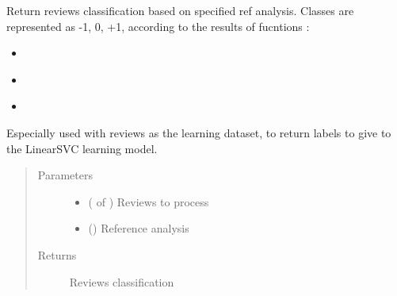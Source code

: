 \documentclass[letterpaper,10pt,english]{sphinxmanual}
\begin{document}
\begin{fulllineitems}
\label{\detokenize{learning:loacore.learning.svm.get_labels_vector}}
Return reviews classification based on specified ref analysis. Classes are represented as -1, 0, +1, according to
the results of {\hyperref[\detokenize{classes:loacore.classes.classes.Polarity}]{}} fucntions :
\begin{itemize}
\item {} 
{\hyperref[\detokenize{classes:loacore.classes.classes.Polarity.is_negative}]{}}

\item {} 
{\hyperref[\detokenize{classes:loacore.classes.classes.Polarity.is_objective}]{}}

\item {} 
{\hyperref[\detokenize{classes:loacore.classes.classes.Polarity.is_positive}]{}}

\end{itemize}

Especially used with reviews as the learning dataset, to return labels to give to the LinearSVC learning model.
\begin{quote}\begin{description}
\item[{Parameters}] \leavevmode\begin{itemize}
\item {} 
 ( of {\hyperref[\detokenize{classes:loacore.classes.classes.Review}]{}}) \textendash{} Reviews to process

\item {} 
 () \textendash{} Reference analysis

\end{itemize}

\item[{Returns}] \leavevmode
Reviews classification

\end{description}\end{quote}

\end{fulllineitems}
\end{document}
